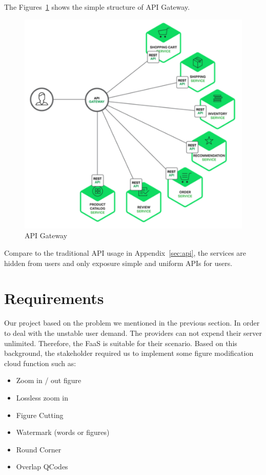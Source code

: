 \documentclass[a4paper,12pt]{article}
\begin{document}
The Figures~\ref{fig:apigateway} shows the simple structure of API Gateway.
\begin{figure}[H]
\centering
\label{fig:apigateway}
\includegraphics[scale=0.281]{figures/api-gateway.png}
\caption{API Gateway}
\end{figure}

Compare to the traditional API usage in Appendix~\ref{sec:api}, the services are hidden from users and only exposure simple and uniform APIs for users. 

\section{Requirements}
Our project based on the problem we mentioned in the previous section. In order to deal with the unstable user demand. The providers can not expend their server unlimited. Therefore, the FaaS is suitable for their scenario. Based on this background, the stakeholder required us to implement some figure modification cloud function such as:
\begin{itemize}
    \item Zoom in / out figure
    \item Lossless zoom in
    \item Figure Cutting
    \item Watermark (words or figures)
    \item Round Corner
    \item Overlap QCodes
\end{itemize}
\end{document}
